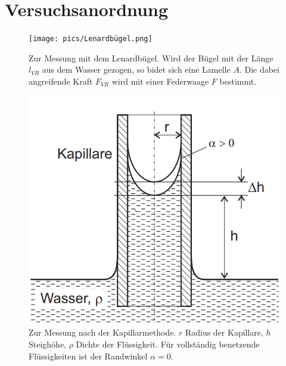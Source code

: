 \documentclass[11pt]{scrartcl}
\begin{document}
\section{Versuchsanordnung}
\label{sec:versuchsanordnung}
\begin{figure}[H]
    \begin{center}
        \begin{minipage}[htbp]{.4\linewidth} %
            \texttt{[image: pics/Lenardbügel.png]}
            \caption[Messung mit dem Lenardbügel]{Zur Messung mit dem Lenardbügel. Wird der Bügel mit der Länge $l_{VR}$ aus dem Wasser gezogen, so bidet sich eine Lamelle $A$. Die dabei angreifende Kraft $F_{VR}$ wird mit einer Federwaage $F$ bestimmt.}
            \label{fig:Lenard}
        \end{minipage}
        \hspace{.1\linewidth}%
        \begin{minipage}[htbp]{.4\linewidth} %
            \includegraphics[width=\linewidth]{pics/Kapillare.png}
            \caption[Messung nach der Kapillarmethode]{Zur Messung nach der Kapillarmethode. $r$ Radius der Kapillare, $h$ Steighöhe, $\rho$ Dichte der Flüssigkeit. Für vollständig benetzende Flüssigkeiten ist der Randwinkel $\alpha = 0$.}
            \label{fig:Kapillare}
        \end{minipage}
    \end{center}
 \end{figure}
\end{document}
